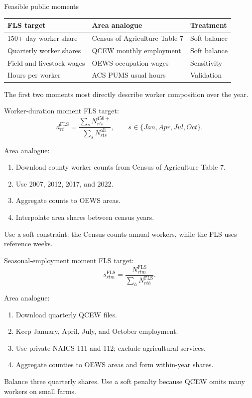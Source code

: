 \documentclass[aspectratio=169,11pt]{beamer}
\newcommand{\FLS}{\mathrm{FLS}}
\begin{document}
\begin{frame}{Feasible public moments}
  \small
  \begin{tabular}{lll}
    \toprule
    FLS target & Area analogue & Treatment \\
    \midrule
    150+ day worker share
      & Census of Agriculture Table 7
      & Soft balance \\
    Quarterly worker shares
      & QCEW monthly employment
      & Soft balance \\
    Field and livestock wages
      & OEWS occupation wages
      & Sensitivity \\
    Hours per worker
      & ACS PUMS usual hours
      & Validation \\
    \bottomrule
  \end{tabular}

  \vspace{0.8em}
  The first two moments most directly describe worker composition over the
  year.
\end{frame}

\begin{frame}{Worker-duration moment}
  FLS target:
  \[
    d^{\FLS}_{rt}
      =\frac{\sum_s N^{150+}_{rts}}{\sum_s N^{\mathrm{all}}_{rts}},
    \qquad s\in\{Jan,Apr,Jul,Oct\}.
  \]

  Area analogue:
  \begin{enumerate}
    \item Download county worker counts from Census of Agriculture Table 7.
    \item Use 2007, 2012, 2017, and 2022.
    \item Aggregate counts to OEWS areas.
    \item Interpolate area shares between census years.
  \end{enumerate}

  Use a soft constraint: the Census counts annual workers, while the FLS uses
  reference weeks.
\end{frame}

\begin{frame}{Seasonal-employment moment}
  FLS target:
  \[
    s^{\FLS}_{rtm}
      =\frac{N^{\FLS}_{rtm}}
      {\sum_hN^{\FLS}_{rth}}.
  \]

  Area analogue:
  \begin{enumerate}
    \item Download quarterly QCEW files.
    \item Keep January, April, July, and October employment.
    \item Use private NAICS 111 and 112; exclude agricultural services.
    \item Aggregate counties to OEWS areas and form within-year shares.
  \end{enumerate}

  Balance three quarterly shares. Use a soft penalty because QCEW omits many
  workers on small farms.
\end{frame}
\end{document}
